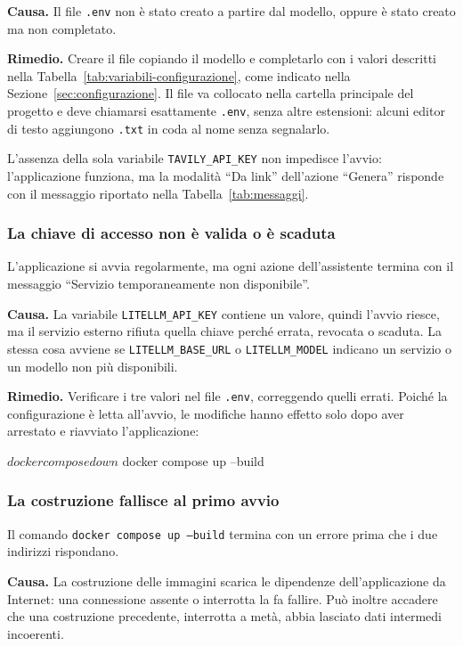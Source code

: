 \documentclass[a4paper, 10pt]{article}
\begin{document}
\textbf{Causa.} Il file \texttt{.env} non è stato creato a partire dal modello, oppure è stato creato ma non completato.

\textbf{Rimedio.} Creare il file copiando il modello e completarlo con i valori descritti nella Tabella~\ref{tab:variabili-configurazione}, come indicato nella Sezione~\ref{sec:configurazione}. Il file va collocato nella cartella principale del progetto e deve chiamarsi esattamente \texttt{.env}, senza altre estensioni: alcuni editor di testo aggiungono \texttt{.txt} in coda al nome senza segnalarlo.

\vspace{0.5em}

\noindent
L'assenza della sola variabile \texttt{TAVILY\_API\_KEY} non impedisce l'avvio: l'applicazione funziona, ma la modalità ``Da link'' dell'azione ``Genera'' risponde con il messaggio riportato nella Tabella~\ref{tab:messaggi}.

\subsubsection{La chiave di accesso non è valida o è scaduta}
L'applicazione si avvia regolarmente, ma ogni azione dell'assistente termina con il messaggio ``Servizio temporaneamente non disponibile''.

\textbf{Causa.} La variabile \texttt{LITELLM\_API\_KEY} contiene un valore, quindi l'avvio riesce, ma il servizio esterno rifiuta quella chiave perché errata, revocata o scaduta. La stessa cosa avviene se \texttt{LITELLM\_BASE\_URL} o \texttt{LITELLM\_MODEL} indicano un servizio o un modello non più disponibili.

\textbf{Rimedio.} Verificare i tre valori nel file \texttt{.env}, correggendo quelli errati. Poiché la configurazione è letta all'avvio, le modifiche hanno effetto solo dopo aver arrestato e riavviato l'applicazione:

\begin{comando}
$ docker compose down
$ docker compose up --build
\end{comando}

\subsubsection{La costruzione fallisce al primo avvio}
Il comando \texttt{docker compose up --build} termina con un errore prima che i due indirizzi rispondano.

\textbf{Causa.} La costruzione delle immagini scarica le dipendenze dell'applicazione da Internet: una connessione assente o interrotta la fa fallire. Può inoltre accadere che una costruzione precedente, interrotta a metà, abbia lasciato dati intermedi incoerenti.
\end{document}
